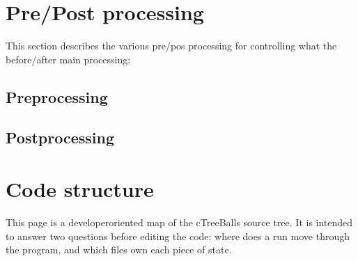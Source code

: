 \documentclass[letterpaper,10pt,english]{sphinxmanual}
\begin{document}
\sphinxstepscope


\chapter{Pre/Post processing}
\label{\detokenize{pre_post_process:pre-post-processing}}\label{\detokenize{pre_post_process::doc}}
\sphinxAtStartPar
This section describes the various pre/pos processing for controlling
what the  before/after main processing:


\section{Pre\sphinxhyphen{}processing}
\label{\detokenize{pre_post_process:pre-processing}}

\section{Post\sphinxhyphen{}processing}
\label{\detokenize{pre_post_process:post-processing}}
\sphinxstepscope


\chapter{Code structure}
\label{\detokenize{code_structure:code-structure}}\label{\detokenize{code_structure::doc}}
\sphinxAtStartPar
This page is a developer\sphinxhyphen{}oriented map of the cTreeBalls source tree. It is
intended to answer two questions before editing the code: where does a run move
through the program, and which files own each piece of state.
\end{document}
